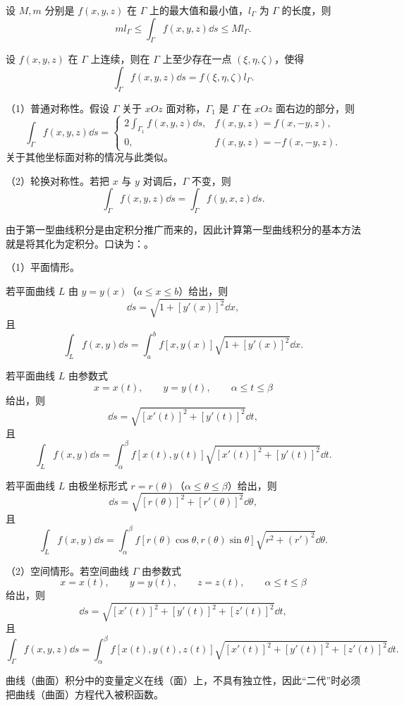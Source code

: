 设 $M,m$ 分别是 $f(x,y,z)$ 在 $\Gamma$ 上的最大值和最小值，$l_{\Gamma}$ 为 $\Gamma$ 的长度，则
\[
ml_{\Gamma}\le\int_{\Gamma}f(x,y,z)\dd s\le Ml_{\Gamma}.
\]

设 $f(x,y,z)$ 在 $\Gamma$ 上连续，则在 $\Gamma$ 上至少存在一点 $(\xi,\eta,\zeta)$，使得
\[
\int_{\Gamma}f(x,y,z)\dd s=f(\xi,\eta,\zeta)l_{\Gamma}.
\]


（1）普通对称性。假设 $\Gamma$ 关于 $xOz$ 面对称，$\Gamma_1$ 是 $\Gamma$ 在 $xOz$ 面右边的部分，则
\[
\int_{\Gamma}f(x,y,z)\dd s=
\begin{cases}
2\displaystyle\int_{\Gamma_1}f(x,y,z)\dd s,&f(x,y,z)=f(x,-y,z),\\[2mm]
0,&f(x,y,z)=-f(x,-y,z).
\end{cases}
\]
关于其他坐标面对称的情况与此类似。

（2）轮换对称性。若把 $x$ 与 $y$ 对调后，$\Gamma$ 不变，则
\[
\int_{\Gamma}f(x,y,z)\dd s=\int_{\Gamma}f(y,x,z)\dd s.
\]


由于第一型曲线积分是由定积分推广而来的，因此计算第一型曲线积分的基本方法就是将其化为定积分。口诀为：。

（1）平面情形。

若平面曲线 $L$ 由 $y=y(x)$（$a\le x\le b$）给出，则
\[
\dd s=\sqrt{1+[y'(x)]^2}\dd x,
\]
且
\[
\int_L f(x,y)\dd s
=\int_a^bf[x,y(x)]\sqrt{1+[y'(x)]^2}\dd x.
\]

若平面曲线 $L$ 由参数式
\[
x=x(t),\qquad y=y(t),\qquad \alpha\le t\le\beta
\]
给出，则
\[
\dd s=\sqrt{[x'(t)]^2+[y'(t)]^2}\dd t,
\]
且
\[
\int_L f(x,y)\dd s
=\int_{\alpha}^{\beta}f[x(t),y(t)]
\sqrt{[x'(t)]^2+[y'(t)]^2}\dd t.
\]

若平面曲线 $L$ 由极坐标形式 $r=r(\theta)$（$\alpha\le\theta\le\beta$）给出，则
\[
\dd s=\sqrt{[r(\theta)]^2+[r'(\theta)]^2}\dd\theta,
\]
且
\[
\int_Lf(x,y)\dd s
=\int_{\alpha}^{\beta}f[r(\theta)\cos\theta,r(\theta)\sin\theta]
\sqrt{r^2+(r')^2}\dd\theta.
\]

（2）空间情形。若空间曲线 $\Gamma$ 由参数式
\[
x=x(t),\qquad y=y(t),\qquad z=z(t),\qquad \alpha\le t\le\beta
\]
给出，则
\[
\dd s=\sqrt{[x'(t)]^2+[y'(t)]^2+[z'(t)]^2}\dd t,
\]
且
\[
\int_{\Gamma}f(x,y,z)\dd s
=\int_{\alpha}^{\beta}f[x(t),y(t),z(t)]
\sqrt{[x'(t)]^2+[y'(t)]^2+[z'(t)]^2}\dd t.
\]

\begin{notebox}
曲线（曲面）积分中的变量定义在线（面）上，不具有独立性，因此“二代”时必须把曲线（曲面）方程代入被积函数。
\end{notebox}

